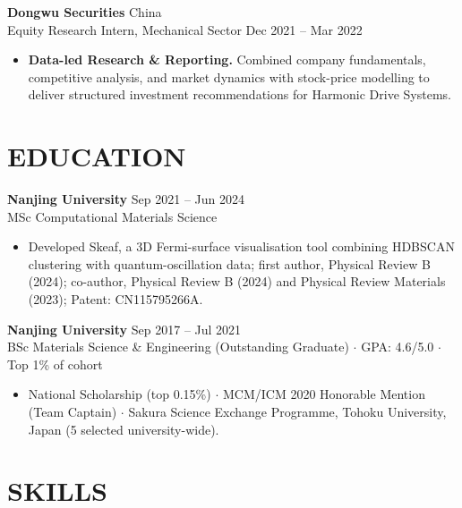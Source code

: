 \documentclass[a4paper,10pt]{article}
\begin{document}
\vspace{2pt}
\noindent\textbf{Dongwu Securities} \hfill China\\
Equity Research Intern, Mechanical Sector \hfill Dec 2021 -- Mar 2022
\begin{itemize}
    \item \textbf{Data-led Research \& Reporting.} Combined company fundamentals, competitive analysis, and market dynamics with stock-price modelling to deliver structured investment recommendations for Harmonic Drive Systems.
\end{itemize}

\section{EDUCATION}

\noindent\textbf{Nanjing University} \hfill Sep 2021 -- Jun 2024\\
MSc Computational Materials Science
\begin{itemize}
    \item Developed Skeaf, a 3D Fermi-surface visualisation tool combining HDBSCAN clustering with quantum-oscillation data; first author, Physical Review B (2024); co-author, Physical Review B (2024) and Physical Review Materials (2023); Patent: CN115795266A.
\end{itemize}

\vspace{2pt}
\noindent\textbf{Nanjing University} \hfill Sep 2017 -- Jul 2021\\
BSc Materials Science \& Engineering (Outstanding Graduate) \;$\cdot$\; GPA: 4.6/5.0 \;$\cdot$\; Top 1\% of cohort
\begin{itemize}
    \item National Scholarship (top 0.15\%) \;$\cdot$\; MCM/ICM 2020 Honorable Mention (Team Captain) \;$\cdot$\; Sakura Science Exchange Programme, Tohoku University, Japan (5 selected university-wide).
\end{itemize}

\section{SKILLS}
\end{document}
